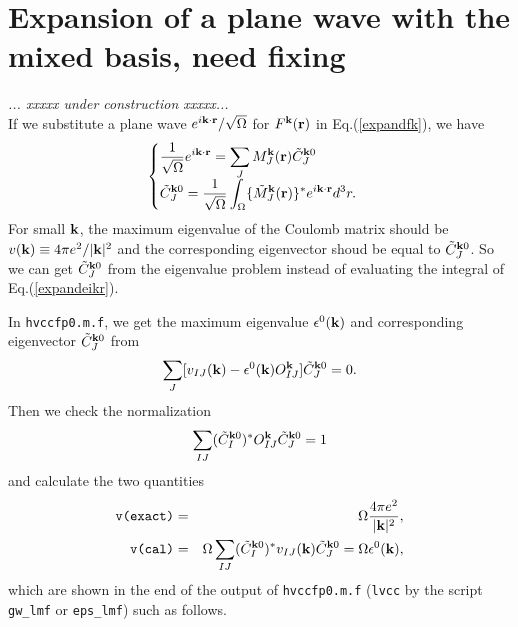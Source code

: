 \documentclass[a4paper,10pt,fleqn]{article}
\def\underconstruction{{\it... xxxxx under construction xxxxx...\\}}
\begin{document}
\section{Expansion of a plane wave with the mixed basis, need fixing}
\underconstruction
If we substitute a plane wave
$e^{i{\bf k \cdot r}}/\sqrt{\Omega}$ 
for $F^{\bf k}(\bf r)$ in Eq.(\ref{expandfk}),
we have
\begin{eqnarray}
\begin{cases}
  \displaystyle 
  \frac{1}{\sqrt{\Omega}}e^{i{\bf k \cdot r}} 
  = \sum_J M_J^{\bf k} ({\bf r}) \tilde{C}^{{\bf k}0}_J & \cr
  \displaystyle
  \tilde{C}^{{\bf k}0}_J = 
  \frac{1}{\sqrt{\Omega}}
  \int_\Omega \{\tilde{M}_J^{\bf k}({\bf r})\}^* 
  e^{i{\bf k \cdot r}} d^3r.
\end{cases}
  \label{expandeikr}
\end{eqnarray}
For small ${\bf k}$, the maximum eigenvalue of the
Coulomb matrix should be $v({\bf k}) \equiv 4\pi e^2/|{\bf k}|^2$
and the corresponding eigenvector shoud be equal to $\tilde{C}^{{\bf k}0}_J$.
So we can get $\tilde{C}^{{\bf k}0}_J$ from the eigenvalue problem
instead of evaluating the integral of Eq.(\ref{expandeikr}).

In \verb|hvccfp0.m.f|, we get the maximum eigenvalue $\epsilon^0({\bf k})$ 
and corresponding eigenvector $\tilde{C}^{{\bf k}0}_J$ from 
\begin{eqnarray}
   \sum_J[v_{IJ}({\bf k}) - \epsilon^0({\bf k})
   O^{\bf k}_{IJ}] \tilde{C}^{{\bf k}0}_J=0.
\end{eqnarray}
Then we check the normalization
\begin{eqnarray}
  \sum_{IJ}( \tilde{C}^{{\bf k}0}_I )^* O_{IJ}^{\bf k}
              \tilde{C}^{{\bf k}0}_J = 1
\end{eqnarray}
and calculate the two quantities
\begin{eqnarray} 
   \verb|v(exact)|
    &=& \Omega \frac{4\pi e^2}{|{\bf k}|^2}, \\
   \verb|v(cal)| 
    &=& \Omega \sum_{IJ}( \tilde{C}^{{\bf k}0}_I )^*v_{IJ}({\bf k}) 
              \tilde{C}^{{\bf k}0}_J
     =  \Omega \epsilon^0({\bf k}),
\end{eqnarray}
which are shown in the end of the output of \verb|hvccfp0.m.f| 
(\verb|lvcc| by the script \verb|gw_lmf| or \verb|eps_lmf|) such as follows.
\end{document}
